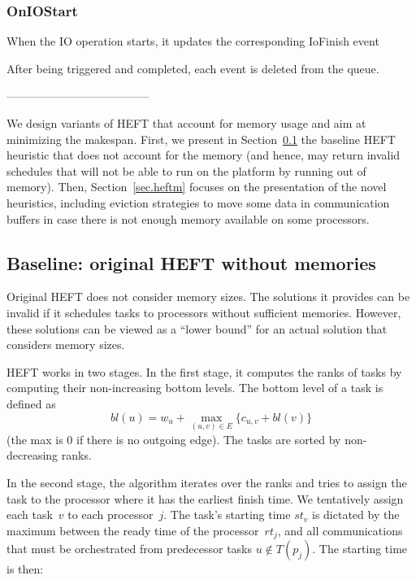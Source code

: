 \documentclass[conference]{IEEEtran}
\begin{document}
    \subsubsection{OnIOStart}
    When the IO operation starts, it updates the corresponding IoFinish event


    After being triggered and completed, each event is deleted from the queue.


--------------------------------------



We design 
variants of HEFT that account for memory usage and aim at minimizing the makespan.
First, we present in Section~\ref{sec.heft} the baseline HEFT heuristic that does not account for the memory
(and hence, may return invalid schedules that will not be able to run on the platform
by running out of memory).  Then, Section~\ref{sec.heftm} focuses on the presentation of the novel
heuristics, including eviction strategies to move some data in communication buffers
in case there is not enough memory available on some processors.

    \subsection{Baseline: original HEFT without memories}
\label{sec.heft}

    Original HEFT does not consider memory sizes.
    The solutions it provides can be invalid if it schedules tasks to processors without sufficient memories.
    However, these solutions can be viewed as a ``lower bound'' for an actual solution that considers memory sizes.

    HEFT works in two stages.
    In the first stage, it computes the ranks of tasks by computing their non-increasing bottom levels.
    The bottom level of a task is defined as
    $$bl(u) = w_u + \max_{(u,v)\in E} \{c_{u,v} + bl(v)\}$$
    (the max is 0 if there is no outgoing edge).
    The tasks are sorted by non-decreasing ranks.

    In the second stage, the algorithm iterates over the ranks and tries to assign the task to the processor where it
    has the earliest finish time.
    We tentatively assign each task~$v$ to each processor~$j$.
    The task's starting time $st_v$ is dictated by the maximum between the ready time of the processor~$rt_j$,
    and all communications that
    must be orchestrated from predecessor tasks $u\notin T(p_j)$.
    The starting time is then:
\end{document}
